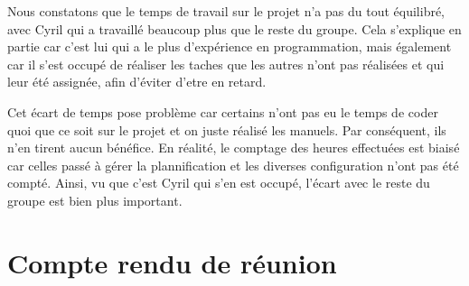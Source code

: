 \documentclass[11pt]{report}
\begin{document}
\par Nous constatons que le temps de travail sur le projet n'a pas du tout 
équilibré, avec Cyril qui a travaillé beaucoup plus que le reste du groupe. Cela s'explique en partie car c'est lui qui a le plus d'expérience en programmation, mais également car il s'est occupé de réaliser les taches que les autres n'ont pas réalisées et qui leur été assignée, afin d'éviter d'etre en retard.\\
\par Cet écart de temps pose problème car certains n'ont pas eu le temps de coder quoi que ce soit sur le projet et on juste réalisé les manuels. Par conséquent, ils n'en tirent aucun bénéfice. En réalité, le comptage des heures effectuées est biaisé car celles passé à gérer la plannification et les diverses configuration n'ont pas été compté. Ainsi, vu que c'est Cyril qui s'en est occupé, l'écart avec le reste du groupe est bien plus important. 



\section{Compte rendu de réunion}
\end{document}
